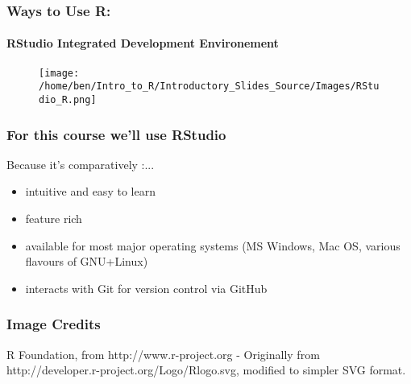 \documentclass[xcolor=dvipsnames]{beamer}
\begin{document}
\begin{frame}
\frametitle{Ways to Use R:}
\framesubtitle{RStudio Integrated Development Environement}
\begin{figure}
\texttt{[image: /home/ben/Intro\_to\_R/Introductory\_Slides\_Source/Images/RStudio\_R.png]}
\end{figure}
\end{frame}

\begin{frame}
\frametitle{For this course we'll use RStudio}
Because it's comparatively :...
\begin{itemize}
\item intuitive and easy to learn
\item feature rich
\item available for most major operating systems (MS Windows, Mac OS, various flavours of GNU+Linux)
\item interacts with Git for version control via GitHub
\end{itemize}

\end{frame}


\begin{frame} 
\frametitle{Image Credits}
R Foundation, from http://www.r-project.org - Originally from http://developer.r-project.org/Logo/Rlogo.svg, modified to simpler SVG format.
%
\end{frame}
\end{document}
